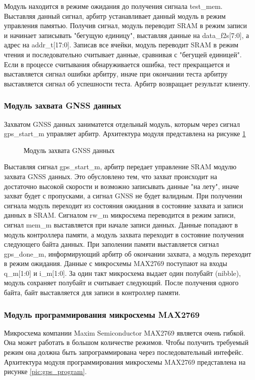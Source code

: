 Модуль находится в режиме ожидания до получения сигнала test\_mem. Выставляя данный сигнал, арбитр устанавливает данный модуль
в режим управления памятью. Получив сигнал, модуль переводит SRAM в режим записи и начинает записывать "бегущую единицу",
выставляя данные на data\_f2s[7:0], а адрес на addr\_t[17:0]. Записав все ячейки, модуль переводит SRAM в режим чтения и последовательно
считывает данные, сравнивая с "бегущей единицей". Если в процессе считывания обнаруживается ошибка, тест прекращается и 
выставляется сигнал ошибки арбитру, иначе при окончании теста арбитру выставляется сигнал об успешности теста. Арбитр возвращает
результат клиенту.

\subsubsection*{Модуль захвата GNSS данных}
\label{sec:gps_acq}
Захватом GNSS данных заниматется отдельный модуль, которым через сигнал gps\_start\_m управляет арбитр. Архитектура модуля
представлена на рисунке \ref{pic:gps_main_arch}

\begin{figure}[H]
\begin{center}
\end{center}
\caption{Модуль захвата GNSS данных}
\label{pic:gps_main_arch}
\end{figure}

Выставляя сигнал gps\_start\_m, арбитр передает управление SRAM модулю захвата GNSS данных. Это обусловлено тем, что захват 
происходит на достаточно высокой скорости и возможно записывать данные "на лету", иначе захват будет с пропусками, а сигнал GNSS
не будет валидным. При получении сигнала модуль переходит из состояния ожидания в состояние захвата и записи данных в SRAM. 
Сигналом rw\_m микросхема переводится в режим записи, сигнал mem\_m выставляется при начале записи данных. Данные попадают
в модуль контроллера памяти, а модуль захвата переходит в состояние получения следующего байта данных. При заполении памяти
выставляется сигнал gps\_done\_m, информирующий арбитр об окончании захвата, а модуль переходит в режим ожидания. Данные с
микросхемы MAX2769 поступают на входы q\_m[1:0] и i\_m[1:0]. За один такт микросхема выдает один полубайт (nibble), модуль
сохраняет полубайт и считывает следующий. После получения одного байта, байт выставляется для записи в контроллер памяти.

\subsubsection*{Модуль программирования микросхемы MAX2769}
\label{sec:gps_program}
Микросхема компании Maxim Semiconductor MAX2769 является очень гибкой. Она может работать в большом количестве режимов.
Чтобы получить требуемый режим она должна быть запрограммирована через последовательный интефейс. Архитектура модуля
программирования микросхемы MAX2769 представлена на рисунке \ref{pic:gps_program}.

